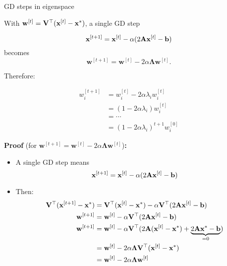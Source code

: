 \documentclass[11pt,compress,t,notes=noshow, xcolor=table]{beamer}
\begin{document}
\begin{vbframe}{GD steps in eigenspace}

With $\mathbf{w}^{[t]} = \mathbf{V}^\top (\mathbf{x}^{[t]} - \mathbf{x}^\ast)$, a single GD step

\begin{equation*}
    \mathbf{x}^{[t + 1]} = \mathbf{x}^{[t]} - \alpha (2 \mathbf{A} \mathbf{x}^{[t]} - \mathbf{b})
\end{equation*}
becomes
\begin{equation*}
    \mathbf{w}^{[t+1]} = \mathbf{w}^{[t]} - 2 \alpha \bm{\Lambda} \mathbf{w}^{[t]}.
\end{equation*}

Therefore:

\vspace{-\baselineskip}

\begin{align*}
    w_i^{[t+1]} &= w_i^{[t]} - 2 \alpha \lambda_i w_i^{[t]} \\
    &= (1 - 2 \alpha \lambda_i) w_i^{[t]} \\
    &= \cdots \\
    &= (1 - 2 \alpha \lambda_i)^{t+1} w_i^{[0]}
\end{align*}

\framebreak

\textbf{Proof} (for $\mathbf{w}^{[t+1]} = \mathbf{w}^{[t]} - 2 \alpha \bm{\Lambda} \mathbf{w}^{[t]}$)\textbf{:}

\begin{itemize}
    \item A single GD step means
        \begin{equation*}
            \mathbf{x}^{[t+1]} = \mathbf{x}^{[t]} - \alpha (2 \mathbf{A} \mathbf{x}^{[t]} - \mathbf{b})
        \end{equation*}
    \item Then:
        \begin{align*}
            \mathbf{V}^\top (\mathbf{x}^{[t+1]} - \mathbf{x}^\ast) &= \mathbf{V}^\top (\mathbf{x}^{[t]} - \mathbf{x}^\ast) - \alpha \mathbf{V}^\top (2 \mathbf{A} \mathbf{x}^{[t]} - \mathbf{b}) \\
            \mathbf{w}^{[t+1]} &= \mathbf{w}^{[t]} - \alpha \mathbf{V}^\top (2 \mathbf{A} \mathbf{x}^{[t]} - \mathbf{b}) \\
            \mathbf{w}^{[t+1]} &= \mathbf{w}^{[t]} - \alpha \mathbf{V}^\top (2 \mathbf{A} (\mathbf{x}^{[t]} - \mathbf{x}^\ast) + \underbrace{2 \mathbf{A} \mathbf{x}^\ast - \mathbf{b}}_{=0}) \\
            &= \mathbf{w}^{[t]} - 2 \alpha \bm{\Lambda} \mathbf{V}^\top (\mathbf{x}^{[t]} - \mathbf{x}^\ast) \\
            &= \mathbf{w}^{[t]} - 2 \alpha \bm{\Lambda} \mathbf{w}^{[t]}
        \end{align*}
\end{itemize}

\end{vbframe}
\end{document}
